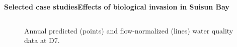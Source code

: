 \documentclass[serif]{beamer}\usepackage[]{graphicx}\usepackage[]{color}
\begin{document}
\begin{frame}{\textbf{Selected case studies}}{\textbf{Effects of biological invasion in Suisun Bay}}
\begin{columns}
\begin{column}{0.35\textwidth}
{}
\end{column}
\begin{column}{0.35\textwidth}
\end{column}
\end{columns}
\vspace{-0.2in}
\begin{figure}
\caption{Annual predicted (points) and flow-normalized (lines) water quality data at D7.}
\end{figure}
\end{frame}
\end{document}
